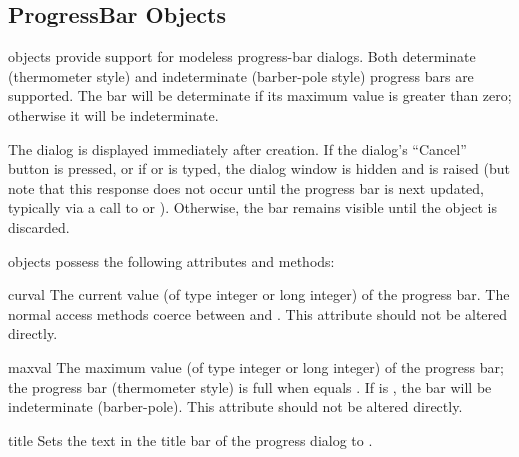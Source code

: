 \begin{seealso}
\end{seealso}


\subsection{ProgressBar Objects \label{progressbar-objects}}

 objects provide support for modeless progress-bar
dialogs.  Both determinate (thermometer style) and indeterminate
(barber-pole style) progress bars are supported.  The bar will be
determinate if its maximum value is greater than zero; otherwise it
will be indeterminate.

The dialog is displayed immediately after creation. If the dialog's
``Cancel'' button is pressed, or if  or  is typed,
the dialog window is hidden and  is
raised (but note that this response does not occur until the progress
bar is next updated, typically via a call to  or
).  Otherwise, the bar remains visible until the
 object is discarded.

 objects possess the following attributes and
methods:

\begin{memberdesc}[ProgressBar]{curval}
The current value (of type integer or long integer) of the progress
bar.  The normal access methods coerce  between
 and .  This attribute should not be altered
directly.
\end{memberdesc}

\begin{memberdesc}[ProgressBar]{maxval}
The maximum value (of type integer or long integer) of the progress
bar; the progress bar (thermometer style) is full when 
equals .  If  is , the bar will
be indeterminate (barber-pole).  This attribute should not be altered
directly.
\end{memberdesc}

\begin{methoddesc}[ProgressBar]{title}{}
Sets the text in the title bar of the progress dialog to
.
\end{methoddesc}

